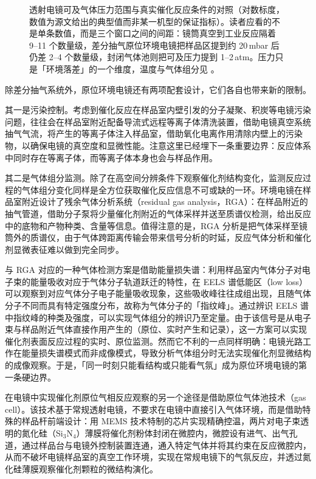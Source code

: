 \begin{figure}[htbp]
\begin{tikzpicture}[x=1mm,y=1mm,font={\fontsize{8}{9.6}\selectfont}]
\end{tikzpicture}
\caption{透射电镜可及气体压力范围与真实催化反应条件的对照（对数标度，数值为源文给出的典型值而非某一机型的保证指标）。读者应看的不是单条数值，而是三个窗口之间的间距：镜筒真空到工业反应隔着 9--11 个数量级，差分抽气原位环境电镜把样品区提到约 20\,mbar 后仍差 2--4 个数量级，封闭气体池则把可及压力提到 1--2\,atm。压力只是「环境落差」的一个维度，温度与气体组分见 。\schemamark}
\label{fig:ch02c-pressure}
\end{figure}

除差分抽气系统外，原位环境电镜还有两项配套设计，它们各自也带来新的限制。

其一是污染控制。考虑到催化反应在样品室内壁引发的分子凝聚、积炭等电镜污染问题，往往会在样品室附近配备导流式远程等离子体清洗装置，借助电镜真空系统抽气气流，将产生的等离子体注入样品室，借助氧化电离作用清除内壁上的污染物，以确保电镜的真空度和显微性能。注意这里已经埋下一条重要边界：反应体系中同时存在等离子体，而等离子体本身也会与样品作用。

其二是气体组分监测。除了在高空间分辨条件下观察催化剂结构变化，监测反应过程的气体组分变化同样是全方位获取催化反应信息不可或缺的一环。环境电镜在样品室附近设计了残余气体分析系统（residual gas analysis，RGA）：在样品附近的抽气管道，借助分子泵将少量催化剂附近的气体采样并送至质谱仪检测，给出反应中的底物和产物种类、含量等信息。值得注意的是，RGA 分析是把气体采样至镜筒外的质谱仪，由于气体跨距离传输会带来信号分析的时延，反应气体分析和催化剂显微表征难以做到完全同步。

与 RGA 对应的一种气体检测方案是借助能量损失谱：利用样品室内气体分子对电子束的能量吸收对应于气体分子轨道跃迁的特性，在 EELS 谱低能区（low loss）可以观察到对应气体分子电子能量吸收现象，这些吸收峰往往成组出现，且随气体分子不同而具有特定强度分布，故称为气体分子的「指纹峰」。通过辨识 EELS 谱中指纹峰的种类及强度，可以实现气体组分的辨识乃至定量。由于该信号是从电子束与样品附近气体直接作用产生的（原位、实时产生和记录），这一方案可以实现催化剂表面反应过程的实时、原位监测。然而它不利的一点同样明确：电镜光路工作在能量损失谱模式而非成像模式，导致分析气体组分时无法实现催化剂显微结构的成像观察。于是，「同一时刻只能看结构或只能看气氛」成为原位环境电镜的第一条硬边界。

在电镜中实现催化剂原位气相反应观察的另一个途径是借助原位气体池技术（gas cell）。该技术基于常规透射电镜，不要求在电镜中直接引入气体环境，而是借助特殊的样品杆前端设计：用 MEMS 技术特制的芯片实现精确控温，两片对电子束透明的氮化硅（Si$_3$N$_4$）薄膜将催化剂粉体封闭在微腔内，微腔设有进气、出气孔道，通过样品台与电镜外控制装置连通，通入特定气体并将其约束在反应微腔内，从而不破坏电镜样品室的真空工作环境，实现在常规电镜下的气氛反应，并透过氮化硅薄膜观察催化剂颗粒的微结构演化。

